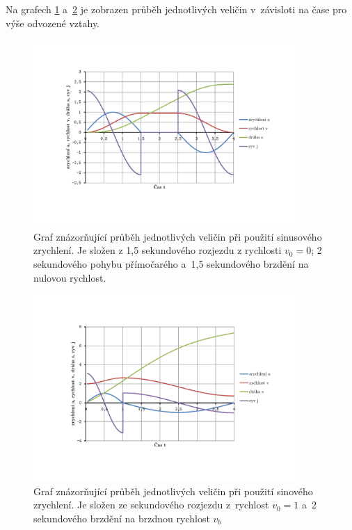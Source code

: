 		Na grafech \ref{graf:linprubeh1} a~\ref{graf:linprubeh2} je zobrazen průběh jednotlivých veličin v~závisloti na čase pro výše odvozené vztahy.
		
		\begin{figure}[h]
			\centering
			\includegraphics[width=0.9\textwidth]{img/graf_primka1.pdf}
			\caption{Graf znázorňující průběh jednotlivých veličin při použití sinusového zrychlení. Je složen z 1,5 sekundového rozjezdu z rychlosti $v_0=0$; 2 sekundového pohybu přímočarého a~1,5 sekundového brzdění na nulovou rychlost.}\label{graf:linprubeh1}	
		\end{figure}
		
		\begin{figure}[h]
			\centering
			\includegraphics[width=0.9\textwidth]{img/graf_primka2.pdf}
			\caption{Graf znázorňující průběh jednotlivých veličin při použití sinového zrychlení. Je složen ze sekundového rozjezdu z~rychlost $v_0=1$ a~2 sekundového brzdění na brzdnou rychlost $v_b$} \label{graf:linprubeh2}
		\end{figure}
		
